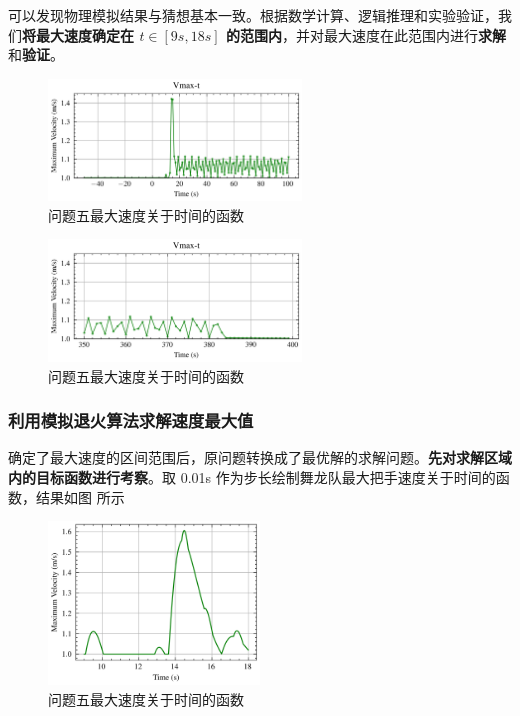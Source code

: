 \documentclass[a4paper]{article}
\begin{document}
		可以发现物理模拟结果与猜想基本一致。根据数学计算、逻辑推理和实验验证，我们\textbf{将最大速度确定在 $t \in [9s,18s]$ 的范围内}，并对最大速度在此范围内进行\textbf{求解}和\textbf{验证}。
		
		\begin{figure}[H]
			\centering
			\includegraphics[width=0.6\textwidth]{image/Figure_5511.png}
			\caption{问题五最大速度关于时间的函数}
			\label{Figure_5511}
		\end{figure}
	
		\begin{figure}[H]
			\centering
			\includegraphics[width=0.6\textwidth]{image/Figure_5512.png}
			\caption{问题五最大速度关于时间的函数}
			\label{Figure_5512}
		\end{figure}
		
	\subsubsection{利用模拟退火算法求解速度最大值}
	
		确定了最大速度的区间范围后，原问题转换成了最优解的求解问题。\textbf{先对求解区域内的目标函数进行考察}。取 0.01s 作为步长绘制舞龙队最大把手速度关于时间的函数，结果如图%
		所示
		
		\begin{figure}[H]
			\centering
			\includegraphics[width=0.5\textwidth]{image/Figure_5514.png}
			\caption{问题五最大速度关于时间的函数}
			\label{Figure_5514}
		\end{figure}
		
\end{document}
